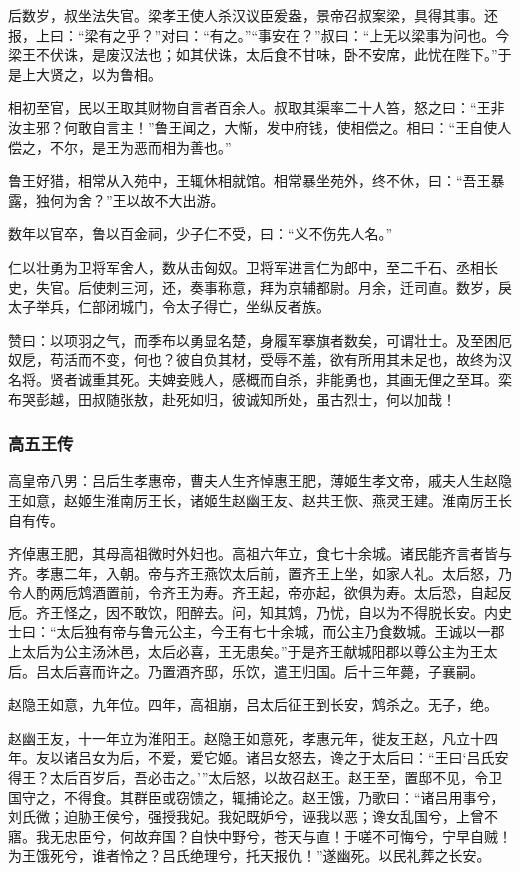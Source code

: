 \documentclass[]{article}
\begin{document}
后数岁，叔坐法失官。梁孝王使人杀汉议臣爰盎，景帝召叔案梁，具得其事。还报，上曰：``梁有之乎？''对曰：``有之。''``事安在？''叔曰：``上无以梁事为问也。今梁王不伏诛，是废汉法也；如其伏诛，太后食不甘味，卧不安席，此忧在陛下。''于是上大贤之，以为鲁相。

相初至官，民以王取其财物自言者百余人。叔取其渠率二十人笞，怒之曰：``王非汝主邪？何敢自言主！''鲁王闻之，大惭，发中府钱，使相偿之。相曰：``王自使人偿之，不尔，是王为恶而相为善也。''

鲁王好猎，相常从入苑中，王辄休相就馆。相常暴坐苑外，终不休，曰：``吾王暴露，独何为舍？''王以故不大出游。

数年以官卒，鲁以百金祠，少子仁不受，曰：``义不伤先人名。''

仁以壮勇为卫将军舍人，数从击匈奴。卫将军进言仁为郎中，至二千石、丞相长史，失官。后使刺三河，还，奏事称意，拜为京辅都尉。月余，迁司直。数岁，戾太子举兵，仁部闭城门，令太子得亡，坐纵反者族。

赞曰：以项羽之气，而季布以勇显名楚，身履军搴旗者数矣，可谓壮士。及至困厄奴戹，苟活而不变，何也？彼自负其材，受辱不羞，欲有所用其未足也，故终为汉名将。贤者诚重其死。夫婢妾贱人，感概而自杀，非能勇也，其画无俚之至耳。栾布哭彭越，田叔随张敖，赴死如归，彼诚知所处，虽古烈士，何以加哉！

\hypertarget{header-n3695}{%
\subsubsection{高五王传}\label{header-n3695}}

高皇帝八男：吕后生孝惠帝，曹夫人生齐悼惠王肥，薄姬生孝文帝，戚夫人生赵隐王如意，赵姬生淮南厉王长，诸姬生赵幽王友、赵共王恢、燕灵王建。淮南厉王长自有传。

齐倬惠王肥，其母高祖微时外妇也。高祖六年立，食七十余城。诸民能齐言者皆与齐。孝惠二年，入朝。帝与齐王燕饮太后前，置齐王上坐，如家人礼。太后怒，乃令人酌两卮鸩酒置前，令齐王为寿。齐王起，帝亦起，欲俱为寿。太后恐，自起反卮。齐王怪之，因不敢饮，阳醉去。问，知其鸩，乃忧，自以为不得脱长安。内史士曰：``太后独有帝与鲁元公主，今王有七十余城，而公主乃食数城。王诚以一郡上太后为公主汤沐邑，太后必喜，王无患矣。''于是齐王献城阳郡以尊公主为王太后。吕太后喜而许之。乃置酒齐邸，乐饮，遣王归国。后十三年薨，子襄嗣。

赵隐王如意，九年位。四年，高祖崩，吕太后征王到长安，鸩杀之。无子，绝。

赵幽王友，十一年立为淮阳王。赵隐王如意死，孝惠元年，徙友王赵，凡立十四年。友以诸吕女为后，不爱，爱它姬。诸吕女怒去，谗之于太后曰：``王曰`吕氏安得王？太后百岁后，吾必击之。'''太后怒，以故召赵王。赵王至，置邸不见，令卫国守之，不得食。其群臣或窃馈之，辄捕论之。赵王饿，乃歌曰：``诸吕用事兮，刘氏微；迫胁王侯兮，强授我妃。我妃既妒兮，诬我以恶；谗女乱国兮，上曾不寤。我无忠臣兮，何故弃国？自快中野兮，苍天与直！于嗟不可悔兮，宁早自贼！为王饿死兮，谁者怜之？吕氏绝理兮，托天报仇！''遂幽死。以民礼葬之长安。
\end{document}
